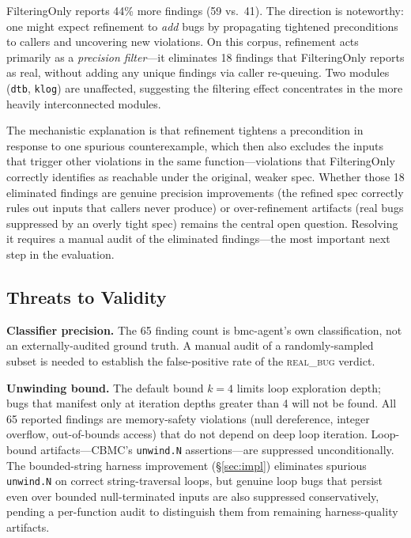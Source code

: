 \documentclass[11pt,a4paper]{article}
\newcommand{\tool}{bmc-agent\xspace}
\begin{document}
FilteringOnly reports 44\% more findings (59 vs.\ 41). The direction is
noteworthy: one might expect refinement to \emph{add} bugs by propagating
tightened preconditions to callers and uncovering new violations. On this
corpus, refinement acts primarily as a \emph{precision filter}---it eliminates
18 findings that FilteringOnly reports as real, without adding any unique
findings via caller re-queuing. Two modules (\texttt{dtb}, \texttt{klog}) are
unaffected, suggesting the filtering effect concentrates in the more heavily
interconnected modules.

The mechanistic explanation is that refinement tightens a precondition in
response to one spurious counterexample, which then also excludes the inputs
that trigger other violations in the same function---violations that
FilteringOnly correctly identifies as reachable under the original, weaker
spec. Whether those 18 eliminated findings are genuine precision improvements
(the refined spec correctly rules out inputs that callers never produce) or
over-refinement artifacts (real bugs suppressed by an overly tight spec)
remains the central open question. Resolving it requires a manual audit of
the eliminated findings---the most important next step in the evaluation.

\subsection{Threats to Validity}

\noindent\textbf{Classifier precision.}
The 65 finding count is \tool's own classification, not an externally-audited
ground truth. A manual audit of a randomly-sampled subset is needed to
establish the false-positive rate of the \textsc{real\_bug} verdict.

\noindent\textbf{Unwinding bound.}
The default bound $k=4$ limits loop exploration depth; bugs that manifest only
at iteration depths greater than 4 will not be found. All 65 reported findings
are memory-safety violations (null dereference, integer overflow, out-of-bounds
access) that do not depend on deep loop iteration.
Loop-bound artifacts---CBMC's \texttt{unwind.N} assertions---are suppressed
unconditionally. The bounded-string harness improvement (\S\ref{sec:impl})
eliminates spurious \texttt{unwind.N} on correct string-traversal loops, but
genuine loop bugs that persist even over bounded null-terminated inputs are also
suppressed conservatively, pending a per-function audit to distinguish them from
remaining harness-quality artifacts.
\end{document}
